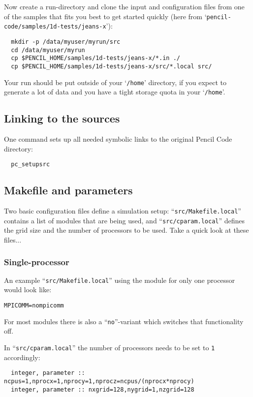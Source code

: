 \documentclass[a4paper,12pt]{article}
\newcommand{\file}[1]{``\texttt{#1}''}
\newcommand{\directory}[1]{`\texttt{#1}'}
\newcommand{\code}[1]{\texttt{#1}}
\begin{document}
Now create a run-directory and clone the input and configuration files from one of the samples that fits you best to get started quickly (here from \directory{pencil-code/samples/1d-tests/jeans-x}):
\begin{verbatim}
  mkdir -p /data/myuser/myrun/src
  cd /data/myuser/myrun
  cp $PENCIL_HOME/samples/1d-tests/jeans-x/*.in ./
  cp $PENCIL_HOME/samples/1d-tests/jeans-x/src/*.local src/
\end{verbatim}
Your run should be put outside of your \directory{/home} directory, if you expect to generate a lot of data and you have a tight storage quota in your \directory{/home}.

\subsection{Linking to the sources}

One command sets up all needed symbolic links to the original Pencil Code directory:
\begin{verbatim}
  pc_setupsrc
\end{verbatim}

\subsection{Makefile and parameters}

Two basic configuration files define a simulation setup: \file{src/Makefile.local} contains a list of modules that are being used, and \file{src/cparam.local} defines the grid size and the number of processors to be used.
Take a quick look at these files...


\subsubsection{Single-processor}
An example \file{src/Makefile.local} using the module for only one processor would look like:
\begin{verbatim}
MPICOMM=nompicomm
\end{verbatim}

For most modules there is also a \file{no}-variant which switches that functionality off.

In \file{src/cparam.local} the number of processors needs to be set to \code{1} accordingly:
\begin{verbatim}
  integer, parameter :: ncpus=1,nprocx=1,nprocy=1,nprocz=ncpus/(nprocx*nprocy)
  integer, parameter :: nxgrid=128,nygrid=1,nzgrid=128
\end{verbatim}
\end{document}
